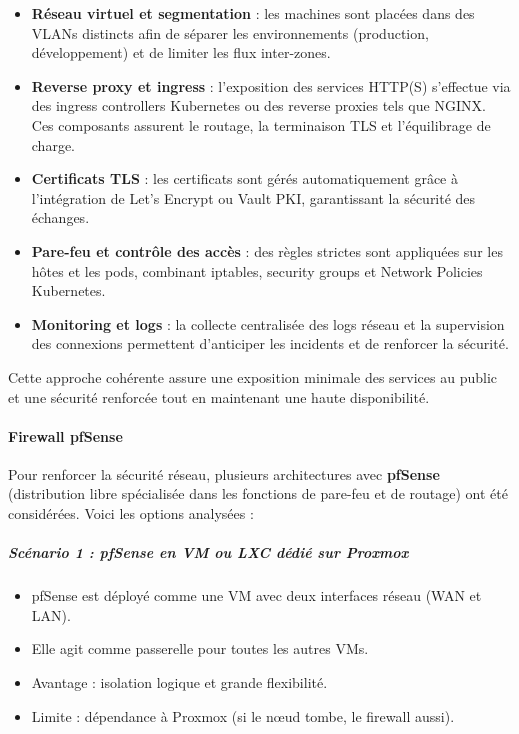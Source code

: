 \begin{itemize}
	\item \textbf{Réseau virtuel et segmentation} : les machines sont placées dans des VLANs distincts afin de séparer les environnements (production, développement) et de limiter les flux inter-zones.
	\item \textbf{Reverse proxy et ingress} : l’exposition des services HTTP(S) s’effectue via des ingress controllers Kubernetes ou des reverse proxies tels que NGINX. Ces composants assurent le routage, la terminaison TLS et l’équilibrage de charge.
	\item \textbf{Certificats TLS} : les certificats sont gérés automatiquement grâce à l’intégration de Let’s Encrypt ou Vault PKI, garantissant la sécurité des échanges.
	\item \textbf{Pare-feu et contrôle des accès} : des règles strictes sont appliquées sur les hôtes et les pods, combinant iptables, security groups et Network Policies Kubernetes.
	\item \textbf{Monitoring et logs} : la collecte centralisée des logs réseau et la supervision des connexions permettent d’anticiper les incidents et de renforcer la sécurité.
\end{itemize}

Cette approche cohérente assure une exposition minimale des services au public et une sécurité renforcée tout en maintenant une haute disponibilité.

\paragraph{Firewall pfSense}

Pour renforcer la sécurité réseau, plusieurs architectures avec \textbf{pfSense} (distribution libre spécialisée dans les fonctions de pare-feu et de routage) ont été considérées. Voici les options analysées :

\subparagraph{Scénario 1 : pfSense en VM ou LXC dédié sur Proxmox}

\begin{itemize}
	\item pfSense est déployé comme une VM avec deux interfaces réseau (WAN et LAN).
	\item Elle agit comme passerelle pour toutes les autres VMs.
	\item Avantage : isolation logique et grande flexibilité.
	\item Limite : dépendance à Proxmox (si le nœud tombe, le firewall aussi).
\end{itemize}

